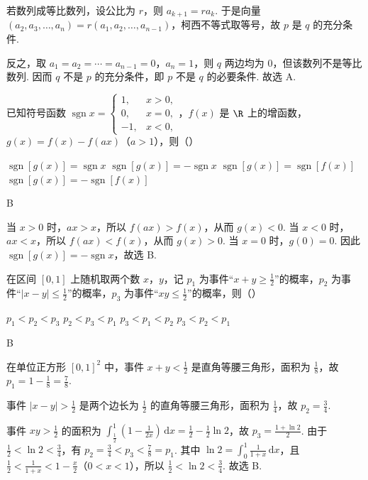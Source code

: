 \begin{solution}
若数列成等比数列，设公比为 \(r\)，则 \(a_{k+1}=r a_k\). 于是向量 \((a_2,a_3,\ldots,a_n)=r(a_1,a_2,\ldots,a_{n-1})\)，柯西不等式取等号，故 \(p\) 是 \(q\) 的充分条件.

反之，取 \(a_1=a_2=\cdots=a_{n-1}=0\)，\(a_n=1\)，则 \(q\) 两边均为 \(0\)，但该数列不是等比数列. 因而 \(q\) 不是 \(p\) 的充分条件，即 \(p\) 不是 \(q\) 的必要条件. 故选 A.
\end{solution}

\begin{problem}
已知符号函数 \(\operatorname{sgn}x=\begin{cases}
1, & x>0,\\
0, & x=0,\\
-1, & x<0,
\end{cases}\)，\(f(x)\) 是 \(\R\) 上的增函数，\(g(x)=f(x)-f(ax)\)（\(a>1\)），则（\quad）

\choices
    {\(\operatorname{sgn}[g(x)]=\operatorname{sgn}x\)}
    {\(\operatorname{sgn}[g(x)]=-\operatorname{sgn}x\)}
    {\(\operatorname{sgn}[g(x)]=\operatorname{sgn}[f(x)]\)}
    {\(\operatorname{sgn}[g(x)]=-\operatorname{sgn}[f(x)]\)}
\end{problem}

\begin{answer}
B
\end{answer}

\begin{solution}
当 \(x>0\) 时，\(ax>x\)，所以 \(f(ax)>f(x)\)，从而 \(g(x)<0\). 当 \(x<0\) 时，\(ax<x\)，所以 \(f(ax)<f(x)\)，从而 \(g(x)>0\). 当 \(x=0\) 时，\(g(0)=0\). 因此 \(\operatorname{sgn}[g(x)]=-\operatorname{sgn}x\)，故选 B.
\end{solution}

\begin{problem}
在区间 \([0,1]\) 上随机取两个数 \(x\)，\(y\)，记 \(p_1\) 为事件“\(x+y\geqslant\frac12\)”的概率，\(p_2\) 为事件“\(|x-y|\leqslant\frac12\)”的概率，\(p_3\) 为事件“\(xy\leqslant\frac12\)”的概率，则（\quad）

\choices
    {\(p_1<p_2<p_3\)}
    {\(p_2<p_3<p_1\)}
    {\(p_3<p_1<p_2\)}
    {\(p_3<p_2<p_1\)}
\end{problem}

\begin{answer}
B
\end{answer}

\begin{solution}
在单位正方形 \([0,1]^2\) 中，事件 \(x+y<\frac12\) 是直角等腰三角形，面积为 \(\frac18\)，故 \(p_1=1-\frac18=\frac78\).

事件 \(|x-y|>\frac12\) 是两个边长为 \(\frac12\) 的直角等腰三角形，面积为 \(\frac14\)，故 \(p_2=\frac34\).

事件 \(xy>\frac12\) 的面积为
\(\displaystyle\int_{\frac{1}{2}}^{1}\left(1-\frac{1}{2x}\right)\,\mathrm dx=\frac12-\frac12\ln2\)，故 \(p_3=\frac{1+\ln2}{2}\). 由于 \(\frac12<\ln2<\frac34\)，有
\(p_2=\frac34<p_3<\frac78=p_1\). 其中
\(\ln2=\displaystyle\int_0^1\frac{1}{1+x}\,\mathrm dx\)，且
\(\frac12<\frac{1}{1+x}<1-\frac{x}{2}\)（\(0<x<1\)），所以 \(\frac12<\ln2<\frac34\). 故选 B.
\end{solution}

